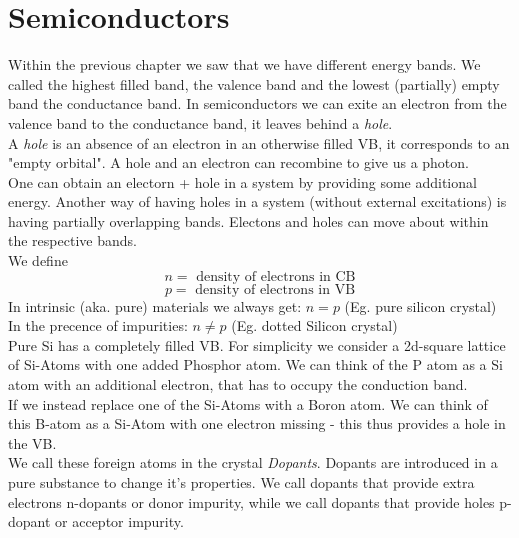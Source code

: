 \documentclass{report}
\begin{document}
\chapter{Semiconductors}
Within the previous chapter we saw that we have different energy bands. We called the highest filled band, the valence band and the lowest (partially) empty band the conductance band. In semiconductors we can exite an electron from the valence band to the conductance band, it leaves behind a \emph{hole}.\\
A \emph{hole} is an absence of an electron in an otherwise filled VB, it corresponds to an "empty orbital". A hole and an electron can recombine to give us a photon. \\
One can obtain an electorn + hole in a system by providing some additional energy. Another way of having holes in a system (without external excitations) is having partially overlapping bands. Electons and holes can move about within the respective bands.\\
We define \[
n = \text{ density of electrons in CB}
\] \[
p = \text{ density of electrons in VB}
\]  
In intrinsic (aka. pure) materials we always get: $n = p$ (Eg. pure silicon crystal)\\
In the precence of impurities: $n \neq p$ (Eg. dotted Silicon crystal)\\
Pure Si has a completely filled VB. For simplicity we consider a 2d-square lattice of Si-Atoms with one added Phosphor atom. We can think of the P atom as a Si atom with an additional electron, that has to occupy the conduction band.\\
If we instead replace one of the Si-Atoms with a Boron atom. We can think of this B-atom as a Si-Atom with one electron missing - this thus provides a hole in the VB. \\
We call these foreign atoms in the crystal \emph{Dopants}. Dopants are introduced in a pure substance to change it's properties. 
We call dopants that provide extra electrons n-dopants or donor impurity, while we call dopants that provide holes p-dopant or acceptor impurity.\\
\end{document}
